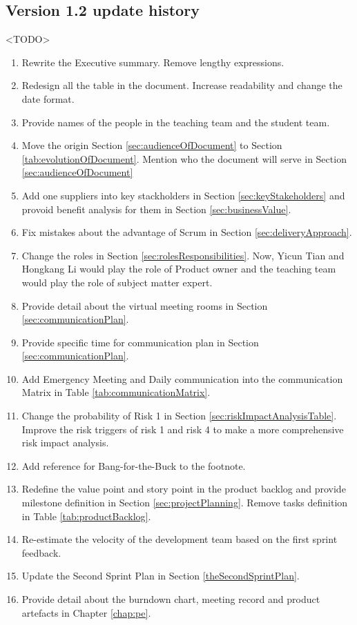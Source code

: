 \documentclass{report}
\begin{document}
\subsection{Version 1.2 update history}
\label{sec:v1-2Up}
<TODO>
  \begin{enumerate}
    \item Rewrite the Executive summary. Remove lengthy expressions.
    \item Redesign all the table in the document. Increase readability and change the date format.
    \item Provide names of the people in the teaching team and the student team.
    \item Move the origin Section \ref{sec:audienceOfDocument} to Section \ref{tab:evolutionOfDocument}. Mention who the document will serve in Section \ref{sec:audienceOfDocument}
    \item Add one suppliers into key stackholders in Section \ref{sec:keyStakeholders} and provoid benefit analysis for them in Section \ref{sec:businessValue}.
    \item Fix mistakes about the advantage of Scrum in Section \ref{sec:deliveryApproach}.
    \item Change the roles in Section \ref{sec:rolesResponsibilities}. Now, Yicun Tian and Hongkang Li would play the role of Product owner and the teaching team would play the role of subject matter expert.
    \item Provide detail about the virtual meeting rooms in Section \ref{sec:communicationPlan}.
    \item Provide specific time for communication plan in Section \ref{sec:communicationPlan}.
    \item Add Emergency Meeting and Daily communication into the communication Matrix in Table \ref{tab:communicationMatrix}.
    \item Change the probability of Risk 1 in Section \ref{sec:riskImpactAnalysisTable}. Improve the risk triggers of risk 1 and risk 4 to make a more comprehensive risk impact analysis.
    \item Add reference for Bang-for-the-Buck to the footnote.
    \item Redefine the value point and story point in the product backlog and provide milestone definition in Section \ref{sec:projectPlanning}. Remove tasks definition in Table \ref{tab:productBacklog}.  
    \item Re-estimate the velocity of the development team based on the first sprint feedback.
    \item Update the Second Sprint Plan in Section \ref{theSecondSprintPlan}.
    \item Provide detail about the burndown chart, meeting record and product artefacts in Chapter{} \ref{chap:pe}.

  \end{enumerate}
\end{document}

